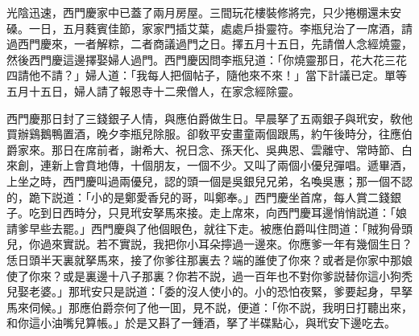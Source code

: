 光陰迅速，西門慶家中已蓋了兩月房屋。三間玩花樓裝修將完，只少捲棚還未安磉。一日，五月蕤賓佳節，家家門插艾葉，處處戶掛靈符。李瓶兒治了一席酒，請過西門慶來，一者解粽，二者商議過門之日。擇五月十五日，先請僧人念經燒靈，然後西門慶這邊擇娶婦人過門。西門慶因問李瓶兒道：「你燒靈那日，花大花三花四請他不請？」婦人道：「我每人把個帖子，隨他來不來！」當下計議已定。單等五月十五日，婦人請了報恩寺十二衆僧人，在家念經除靈。

西門慶那日封了三錢銀子人情，與應伯爵做生日。早晨拏了五兩銀子與玳安，敎他買辦鷄鵝鴨置酒，晚夕李瓶兒除服。卻敎平安畫童兩個跟馬，約午後時分，往應伯爵家來。那日在席前者，謝希大、祝日念、孫天化、吳典恩、雲離守、常時節、白來創，連新上會賁地傳，十個朋友，一個不少。又叫了兩個小優兒彈唱。遞畢酒，上坐之時，西門慶叫過兩優兒，認的頭一個是吳銀兒兄弟，名喚吳惠；那一個不認的，跪下説道：「小的是鄭愛香兒的哥，叫鄭奉。」西門慶坐首席，每人賞二錢銀子。吃到日西時分，只見玳安拏馬來接。走上席來，向西門慶耳邊悄悄説道：「娘請爹早些去罷。」西門慶與了他個眼色，就往下走。被應伯爵叫住問道：「賊狗骨頭兒，你過來實説。若不實説，我把你小耳朵擰過一邊來。你應爹一年有幾個生日？恁日頭半天裏就拏馬來，接了你爹往那裏去？端的誰使了你來？或者是你家中那娘使了你來？或是裏邊十八子那裏？你若不説，過一百年也不對你爹説替你這小狗秃兒娶老婆。」那玳安只是説道：「委的沒人使小的。小的恐怕夜緊，爹要起身，早拏馬來伺候。」那應伯爵奈何了他一囬，見不説，便道：「你不説，我明日打聽出來，和你這小油嘴兒算帳。」於是又斟了一鍾酒，拏了半碟點心，與玳安下邊吃去。

